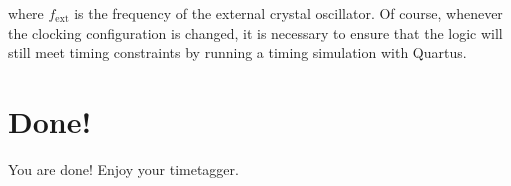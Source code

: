 where $f_\mathrm{ext}$ is the frequency of the external crystal
oscillator. Of course, whenever the clocking configuration is changed,
it is necessary to ensure that the logic will still meet timing
constraints by running a timing simulation with Quartus.

\section{Done!}
You are done! Enjoy your timetagger.

\begin{comment}
\begin{figure}
  \center
  \texttt{[image: T.jpeg]}
  \caption{T the turtle says ``Hello!''.}
  \label{fig:T}
\end{figure}
\end{comment}

